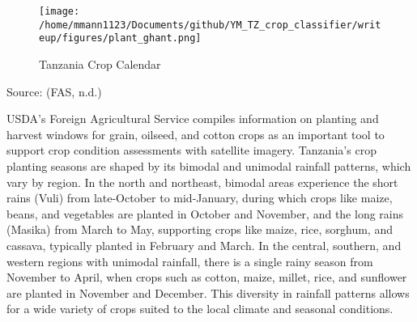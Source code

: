 \documentclass[
]{article}
\begin{document}
\begin{figure}[H]
   \centering   \texttt{[image: /home/mmann1123/Documents/github/YM\_TZ\_crop\_classifier/writeup/figures/plant\_ghant.png]}
   \caption{Tanzania Crop Calendar }
   \label{fig:crop_cal} %
\end{figure}

Source: (FAS, n.d.)

USDA's Foreign Agricultural Service compiles information on planting and
harvest windows for grain, oilseed, and cotton crops as an important
tool to support crop condition assessments with satellite imagery.
Tanzania's crop planting seasons are shaped by its bimodal and unimodal
rainfall patterns, which vary by region. In the north and northeast,
bimodal areas experience the short rains (Vuli) from late-October to
mid-January, during which crops like maize, beans, and vegetables are
planted in October and November, and the long rains (Masika) from March
to May, supporting crops like maize, rice, sorghum, and cassava,
typically planted in February and March. In the central, southern, and
western regions with unimodal rainfall, there is a single rainy season
from November to April, when crops such as cotton, maize, millet, rice,
and sunflower are planted in November and December. This diversity in
rainfall patterns allows for a wide variety of crops suited to the local
climate and seasonal conditions.
\end{document}
